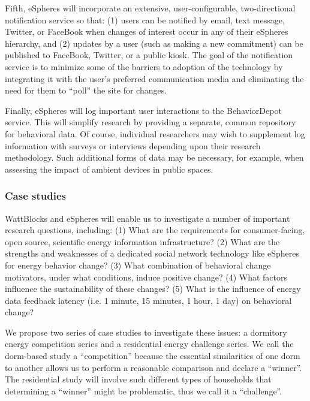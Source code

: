 Fifth, eSpheres will incorporate an extensive, user-configurable,
two-directional notification service so that: (1) users can be notified by
email, text message, Twitter, or FaceBook when changes of interest occur in
any of their eSpheres hierarchy, and (2) updates by a user (such as making
a new commitment) can be published to FaceBook, Twitter, or a public
kiosk. The goal of the notification service is to minimize some of the
barriers to adoption of the technology by integrating it with the user's
preferred communication media and eliminating the need for them to ``poll''
the site for changes.  

Finally, eSpheres will log important user interactions to the BehaviorDepot
service.  This will simplify research by providing a separate, common
repository for behavioral data.  Of course, individual researchers may wish
to supplement log information with surveys or interviews depending upon
their research methodology.  Such additional forms of data may be
necessary, for example, when assessing the impact of ambient devices in
public spaces.

\subsubsection{Case studies}

WattBlocks and eSpheres will enable us to investigate a number of
important research questions, including: (1) What are the requirements
for consumer-facing, open source, scientific energy information
infrastructure? (2) What are the strengths and weaknesses of a dedicated
social network technology like eSpheres for energy behavior change? (3)
What combination of behavioral change motivators, under what conditions,
induce positive change? (4) What factors influence the sustainability of
these changes? (5) What is the influence of energy data feedback latency
(i.e. 1 minute, 15 minutes, 1 hour, 1 day) on behavioral change? 

We propose two series of case studies to investigate these issues:
a dormitory energy competition series and a residential energy challenge
series.  We call the dorm-based study a ``competition'' because the
essential similarities of one dorm to another allows us to perform a
reasonable comparison and declare a ``winner''.  The residential study will
involve such different types of households that determining a ``winner''
might be problematic, thus we call it a ``challenge''.  

